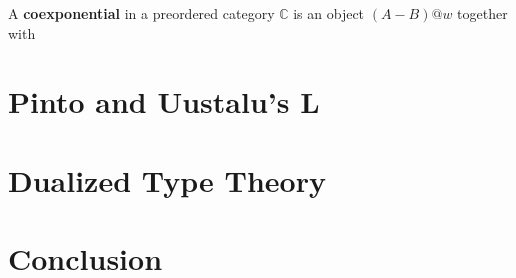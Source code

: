 \documentclass{article}
\begin{document}
\begin{definition}
  \label{def:internal_hom}
  A \textbf{coexponential} in a preordered category $\mathbb{C}$ is an
  object $(A - B)@w$ together with 
\end{definition}

\section{Pinto and Uustalu's L}
\label{sec:pinto_and_uustalu's_l}


\section{Dualized Type Theory}
\label{sec:dualized_type_theory}


\section{Conclusion}
\label{sec:conclusion}

\end{document}
